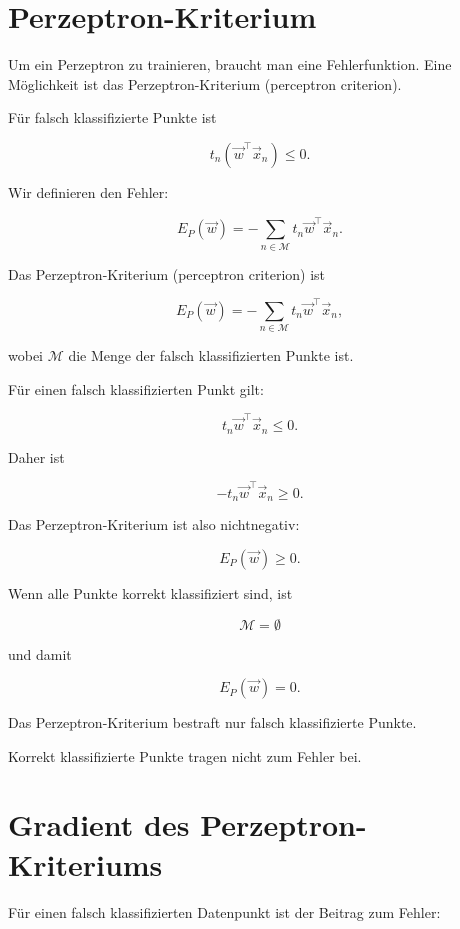\section{Perzeptron-Kriterium}

Um ein Perzeptron zu trainieren, braucht man eine Fehlerfunktion.
Eine Möglichkeit ist das Perzeptron-Kriterium (perceptron criterion).

Für falsch klassifizierte Punkte ist

\[
    t_n(\vec{w}^{\top}\vec{x}_n)\leq 0.
\]

Wir definieren den Fehler:

\[
    E_P(\vec{w})
    =
    -\sum_{n\in\mathcal{M}}
    t_n
    \vec{w}^{\top}\vec{x}_n.
\]

\begin{definitionbox}
Das Perzeptron-Kriterium (perceptron criterion) ist

\[
    E_P(\vec{w})
    =
    -\sum_{n\in\mathcal{M}}
    t_n
    \vec{w}^{\top}\vec{x}_n,
\]

wobei \(\mathcal{M}\) die Menge der falsch klassifizierten Punkte ist.
\end{definitionbox}

Für einen falsch klassifizierten Punkt gilt:

\[
    t_n\vec{w}^{\top}\vec{x}_n\leq 0.
\]

Daher ist

\[
    -t_n\vec{w}^{\top}\vec{x}_n\geq 0.
\]

Das Perzeptron-Kriterium ist also nichtnegativ:

\[
    E_P(\vec{w})\geq 0.
\]

Wenn alle Punkte korrekt klassifiziert sind, ist

\[
    \mathcal{M}=\emptyset
\]

und damit

\[
    E_P(\vec{w})=0.
\]

\begin{conceptbox}
Das Perzeptron-Kriterium bestraft nur falsch klassifizierte Punkte.

Korrekt klassifizierte Punkte tragen nicht zum Fehler bei.
\end{conceptbox}

\section{Gradient des Perzeptron-Kriteriums}

Für einen falsch klassifizierten Datenpunkt ist der Beitrag zum Fehler:

